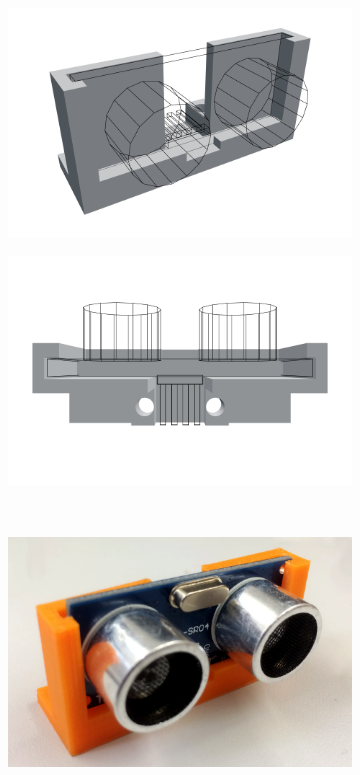 \documentclass[a4paper, 12pt]{scrartcl}
\begin{document}
\begin{figure}[ht!] \centering
	\begin{subfigure}{.5\textwidth} \centering
		\includegraphics[width=\textwidth]{../3D-Druck_Modelle/Sensorhalterung.png}
	\end{subfigure}%
	\begin{subfigure}{.5\textwidth} \centering
		\includegraphics[width=\textwidth]{../3D-Druck_Modelle/Sensorhalterung_Top.png}
	\end{subfigure}\\
	\begin{subfigure}{.5\textwidth} \centering
		\includegraphics[width=\textwidth]{../bilder_videos/Sensorhalterung.png}

\end{subfigure}
\end{figure}
\end{document}

